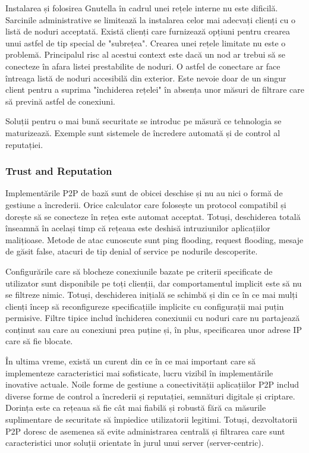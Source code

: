 Instalarea și folosirea Gnutella în cadrul unei rețele interne nu este
dificilă. Sarcinile administrative se limitează la instalarea celor mai
adecvați clienți cu o listă de noduri acceptată. Există clienți care
furnizează opțiuni pentru crearea unui astfel de tip special de "subrețea".
Crearea unei rețele limitate nu este o problemă. Principalul risc al acestui
context este dacă un nod ar trebui să se conecteze în afara listei
prestabilite de noduri. O astfel de conectare ar face întreaga listă de noduri
accesibilă din exterior. Este nevoie doar de un singur client pentru a suprima
"închiderea rețelei" în absența unor măsuri de filtrare care să prevină astfel
de conexiuni.

Soluții pentru o mai bună securitate se introduc pe măsură ce tehnologia se
maturizează. Exemple sunt sistemele de încredere automată și de control al
reputației.

\subsubsection{Trust and Reputation}

Implementările P2P de bază sunt de obicei deschise și nu au nici o formă de
gestiune a încrederii. Orice calculator care folosește un protocol compatibil
și dorește să se conecteze în rețea este automat acceptat. Totuși, deschiderea
totală înseamnă în același timp că rețeaua este deshisă intruziunilor
aplicațiilor malițioase. Metode de atac cunoscute sunt ping flooding, request
flooding, mesaje de găsit false, atacuri de tip denial of service pe nodurile
descoperite.

Configurările care să blocheze conexiunile bazate pe criterii specificate de
utilizator sunt disponibile pe toți clienții, dar comportamentul implicit este
să nu se filtreze nimic. Totuși, deschiderea inițială se schimbă și din ce în
ce mai mulți clienți încep să reconfigureze specificațiile implicite cu
configurații mai puțin permisive. Filtre tipice includ închiderea conexiunii
cu noduri care nu partajează conținut sau care au conexiuni prea puține și, în
plus, specificarea unor adrese IP care să fie blocate.

În ultima vreme, există un curent din ce în ce mai important care să
implementeze caracteristici mai sofisticate, lucru vizibil în implementările
inovative actuale. Noile forme de gestiune a conectivității aplicațiilor P2P
includ diverse forme de control a încrederii și reputației, semnături digitale
și criptare. Dorința este ca rețeaua să fie cât mai fiabilă și robustă fără ca
măsurile suplimentare de securitate să împiedice utilizatorii legitimi.
Totuși, dezvoltatorii P2P doresc de asemenea să evite administrarea centrală
și filtrarea care sunt caracteristici unor soluții orientate în jurul unui
server (server-centric).

